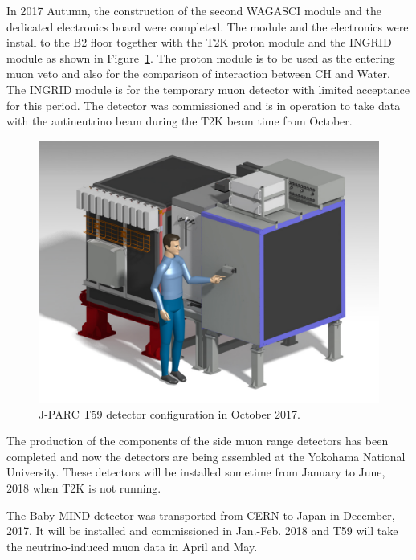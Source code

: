 In 2017 Autumn, the construction of the second WAGASCI module and the dedicated electronics board were completed.
The module and the electronics were install to the B2 floor together with the T2K proton module and the INGRID
module as shown in Figure~\ref{fig:det_confg_oct_dec2017}.
The proton module is to be used as the entering muon veto and also for the comparison of interaction between CH and Water.
The INGRID module is for the temporary muon detector with limited acceptance for this period.
The detector was commissioned and is in operation to take data with the antineutrino beam during the T2K beam time from October.

 \begin{figure}[tbhp]
 \begin{center}
\includegraphics[width=0.6\linewidth]{fig/Proton_Wagasci_Ingrid_Configuration.pdf}
 \end{center}
 \caption{
 J-PARC T59 detector configuration in October 2017.
 }
 \label{fig:det_confg_oct_dec2017}
 \end{figure}

The production of the components of the side muon range detectors has been completed and now the detectors
are being assembled at the Yokohama National University.
These detectors will be installed sometime from January to June, 2018 when T2K is not running.

The Baby MIND detector was transported from CERN to Japan in December, 2017.
It will be installed and commissioned in Jan.-Feb. 2018 and T59 will take the neutrino-induced muon data in April and May.



